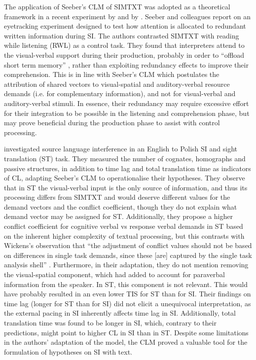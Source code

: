 The application of Seeber's CLM of SIMTXT was adopted as a theoretical framework in a recent experiment by \citet{seeber_when_2020} and by \citet{chmiel_eye_2020}. Seeber and colleagues report on an eyetracking experiment designed to test how attention is allocated to redundant written information during SI. The authors contrasted SIMTXT with reading while listening (RWL) as a control task. They found that interpreters attend to the visual-verbal support during their production, probably in order to ``offload short term memory'' \citep[13]{seeber_when_2020}, rather than exploiting redundancy effects to improve their comprehension. This is in line with Seeber's CLM which postulates the attribution of shared vectors to visual-spatial and auditory-verbal resource demands (i.e. for complementary information), and not for visual-verbal and auditory-verbal stimuli. In essence, their redundancy may require excessive effort for their integration to be possible in the listening and comprehension phase, but may prove beneficial during the production phase to assist with control processing.

\citet{chmiel_eye_2020} investigated source language interference in an English to Polish SI and sight translation (ST) task. They measured the number of cognates, homographs and passive structures, in addition to time lag and total translation time as indicators of CL, adapting Seeber's CLM to operationalise their hypotheses. They observe that in ST the visual-verbal input is the only source of information, and thus its processing differs from SIMTXT and would deserve different values for the demand vectors and the conflict coefficient, though they do not explain what demand vector may be assigned for ST. Additionally, they propose a higher conflict coefficient for cognitive verbal vs response verbal demands in ST based on the inherent higher complexity of textual processing, but this contrasts with Wickens's observation that ``the adjustment of conflict values should not be based on differences in single task demands, since these [are] captured by the single task analysis shell'' \citep[170]{wickens_multiple_2002}. Furthermore, in their adaptation, they do not mention removing the visual-spatial component, which \citet{seeber_multimodal_2017} had added to account for paraverbal information from the speaker. In ST, this component is not relevant. This would have probably resulted in an even lower TIS for ST than for SI. Their findings on time lag (longer for ST than for SI) did not elicit a unequivocal interpretation, as the external pacing in SI inherently affects time lag in SI. Additionally, total translation time was found to be longer in SI, which, contrary to their predictions, might point to higher CL in SI than in ST. Despite some limitations in the authors' adaptation of the model, the CLM proved a valuable tool for the formulation of hypotheses on SI with text.


